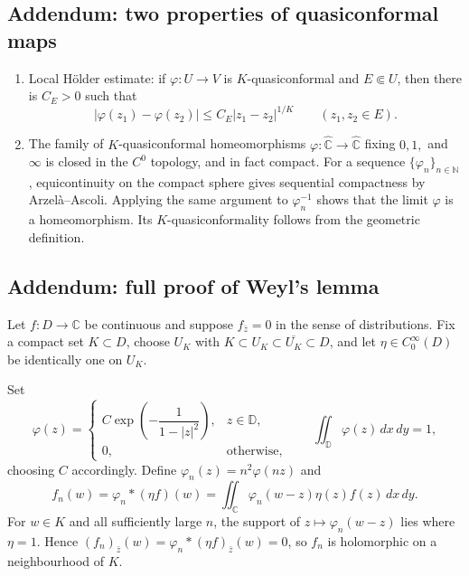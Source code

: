 \documentclass[11pt,a4paper]{article}
\begin{document}
\subsection{Addendum: two properties of quasiconformal maps}
\begin{enumerate}
\setcounter{enumi}{0}\item Local H\"older estimate: if $\varphi:U\to V$ is $K$-quasiconformal and $E\Subset U$, then there is $C_E>0$ such that
\[
|\varphi(z_1)-\varphi(z_2)|\le C_E|z_1-z_2|^{1/K}\qquad(z_1,z_2\in E).
\]
\setcounter{enumi}{1}\item The family of $K$-quasiconformal homeomorphisms $\varphi\colon\widehat{\mathbb C}\to\widehat{\mathbb C}$ fixing $0,1,$ and $\infty$ is closed in the $C^0$ topology, and in fact compact. For a sequence $\{\varphi_n\}_{n\in\mathbb N}$, equicontinuity on the compact sphere gives sequential compactness by Arzel\`a--Ascoli. Applying the same argument to $\varphi_n^{-1}$ shows that the limit $\varphi$ is a homeomorphism. Its $K$-quasiconformality follows from the geometric definition.
\end{enumerate}
\subsection{Addendum: full proof of Weyl's lemma}
Let $f:D\to\mathbb C$ be continuous and suppose $f_{\bar z}=0$ in the sense of distributions. Fix a compact set $K\subset D$, choose $U_K$ with $K\subset U_K\subset\overline{U_K}\subset D$, and let $\eta\in C_0^\infty(D)$ be identically one on $U_K$.

Set
\[
\varphi(z)=\begin{cases}
C\exp\!\left(-\dfrac1{1-|z|^2}\right),&z\in\mathbb D,\\
0,&\text{otherwise},
\end{cases}
\qquad\iint_{\mathbb D}\varphi(z)\,dx\,dy=1,
\]
choosing $C$ accordingly. Define $\varphi_n(z)=n^2\varphi(nz)$ and
\[
f_n(w)=\varphi_n*(\eta f)(w)
=\iint_{\mathbb C}\varphi_n(w-z)\eta(z)f(z)\,dx\,dy.
\]
For $w\in K$ and all sufficiently large $n$, the support of $z\mapsto\varphi_n(w-z)$ lies where $\eta=1$. Hence $(f_n)_{\bar z}(w)=\varphi_n*(\eta f)_{\bar z}(w)=0$, so $f_n$ is holomorphic on a neighbourhood of $K$.
\end{document}
